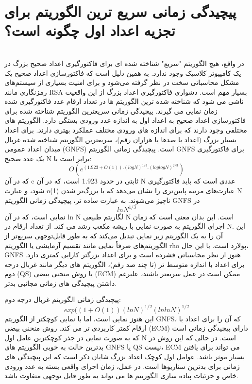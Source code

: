 \documentclass{article}
\begin{document}
\section{پیچیدگی زمانی سریع ترین الگوریتم برای تجزیه اعداد اول چگونه است؟}
\leavevmode
\\
در واقع، هیچ الگوریتم "سریع" شناخته شده ای برای فاکتورگیری اعداد صحیح بزرگ در یک کامپیوتر کلاسیک وجود ندارد. به همین دلیل است که فاکتورسازی اعداد صحیح یک مشکل محاسباتی سخت در نظر گرفته می‌شود و برای امنیت بسیاری از سیستم‌های رمزنگاری مانند RSA بسیار مهم است.
دشواری فاکتورگیری اعداد بزرگ از این واقعیت ناشی می شود که شناخته شده ترین الگوریتم ها در تعداد ارقام عدد فاکتورگیری شده زمان نمایی می گیرند.
پیچیدگی زمانی سریعترین الگوریتم شناخته شده برای فاکتورسازی اعداد صحیح به اعداد اول به اندازه عدد ورودی بستگی دارد. الگوریتم های مختلفی وجود دارند که برای اندازه های ورودی مختلف عملکرد بهتری دارند.
برای اعداد بسیار بزرگ (اعداد با صدها یا هزاران رقم)، سریعترین الگوریتم شناخته شده غربال میدان اعداد عمومی (GNFS) است. پیچیدگی زمانی الگوریتم GNFS برای فاکتورگیری یک عدد صحیح N برابر است با:
\[O(e^{(1.923 + O(1)).(logN)^{1/3}.(log logN)^{2/3}})\]
که در آن c ثابتی در حدود 1.923 است، که در آن N عددی است که باید فاکتورگیری شود، و عبارت o(1) عبارت‌های مرتبه پایین‌تری را نشان می‌دهد که با بزرگ‌تر شدن N ناچیز می‌شوند.
به عبارت ساده تر، پیچیدگی زمانی الگوریتم GNFS در 
\[lnN^{1/3}\]
 نمایی است، که در آن ln N لگاریتم طبیعی N است. این بدان معنی است که زمان اجرای الگوریتم به صورت نمایی با ریشه مکعب رشد می کند. از تعداد ارقام در N. این آن را به یک الگوریتم زیر نمایی تبدیل می‌کند که به طور قابل‌توجهی سریع‌تر از الگوریتم‌های صرفاً نمایی مانند تقسیم آزمایشی یا الگوریتم rho پولارد است. با این حال، GNFS هنوز از نظر محاسباتی فشرده است و برای اعداد بزرگتر کارایی کمتری دارد.
برای اعداد با اندازه متوسط تر (تا چند صد رقم)، الگوریتم های دیگر مانند غربال درجه دوم (QS) یا روش منحنی بیضی (ECM) ممکن است در عمل سریعتر باشند، علیرغم داشتن پیچیدگی های زمانی مجانبی بدتر.

پیچیدگی زمانی الگوریتم غربال درجه دوم:
\[exp((1+O(1))(lnN)^{1/2}(lnlnN)^{1/2}\]
این هنوز نمایی است، اما با نمایی کوچکتر از الگوریتم GNFS، که آن را برای اعداد با ارقام کمتر کاربردی تر می کند.
روش منحنی بیضی (ECM) دارای پیچیدگی زمانی است که به صورت نمایی در جذر کوچکترین عامل اول N است. در حالی که این روش در بدترین حالت به خوبی الگوریتم های GNFS یا QS نیست، ECM می تواند برای یافتن بسیار موثر باشد. عوامل اول کوچک اعداد بزرگ
شایان ذکر است که این پیچیدگی های زمانی برای بدترین سناریوها است. در عمل، زمان اجرای واقعی بسته به عدد ورودی خاص و جزئیات پیاده سازی الگوریتم ها می تواند به طور قابل توجهی متفاوت باشد.
\end{document}
